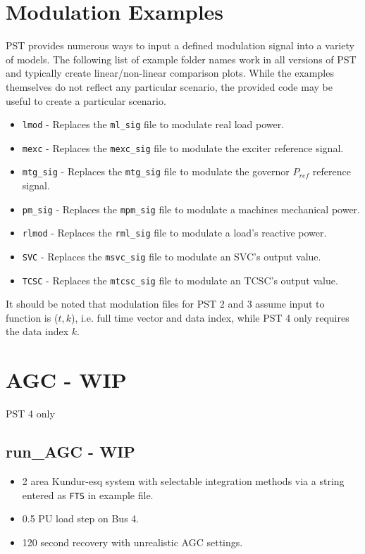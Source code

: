 \section{Modulation Examples} \label{sec: modExamples}
PST provides numerous ways to input a defined modulation signal into a variety of models.
The following list of example folder names work in all versions of PST and typically create linear/non-linear comparison plots.
While the examples themselves do not reflect any particular scenario, the provided code may be useful to create a particular scenario.

\begin{itemize}
\item \verb|lmod| - Replaces the \verb|ml_sig| file to modulate real load power.
\item \verb|mexc| - Replaces the \verb|mexc_sig| file to modulate the exciter reference signal.
\item \verb|mtg_sig| - Replaces the \verb|mtg_sig| file to modulate the governor $P_{ref}$ reference signal.
\item \verb|pm_sig| - Replaces the \verb|mpm_sig| file to modulate a machines mechanical power.
\item \verb|rlmod| - Replaces the \verb|rml_sig| file to modulate a load's reactive power.
\item \verb|SVC| - Replaces the \verb|msvc_sig| file to modulate an SVC's output value.
\item \verb|TCSC| - Replaces the \verb|mtcsc_sig| file to modulate an TCSC's output value.
\end{itemize}

\noindent It should be noted that modulation files for PST 2 and 3 assume input to function is ($t, k$), i.e. full time vector and data index, while PST 4 only requires the data index $k$.


\pagebreak
\section{AGC - WIP}
PST 4 only

\subsection{run\_AGC - WIP}
\begin{itemize}
 em
\item 2 area Kundur-esq system with selectable integration methods via a string entered as \verb|FTS| in example file.
\item 0.5 PU load step on Bus 4. 
\item 120 second recovery with unrealistic AGC settings.
\end{itemize}

